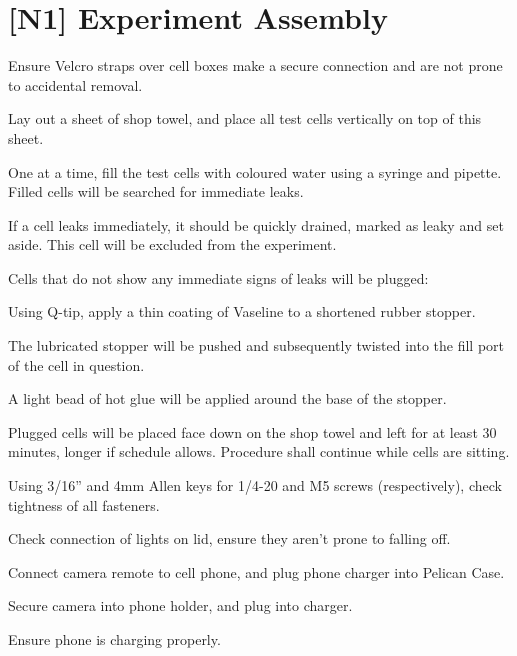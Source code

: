 \section{[N1] Experiment Assembly}
\begin{checklist}
    \item Ensure Velcro straps over cell boxes make a secure connection and are not prone to accidental removal.
    \item Lay out a sheet of shop towel, and place all test cells vertically on top of this sheet.
    \item One at a time, fill the test cells with coloured water using a syringe and pipette. Filled cells will be searched for immediate leaks.
    \begin{checklist}
        \item If a cell leaks immediately, it should be quickly drained, marked as leaky and set aside. This cell will be excluded from the experiment.
        \item Cells that do not show any immediate signs of leaks will be plugged:
        \begin{checklist}
            \item Using Q-tip, apply a thin coating of Vaseline to a shortened rubber stopper.
            \item The lubricated stopper will be pushed and subsequently twisted into the
fill port of the cell in question.
            \item A light bead of hot glue will be applied around the base of the stopper.
        \end{checklist}
        \item Plugged cells will be placed face down on the shop towel and left for at least 30 minutes, longer if schedule allows.  Procedure shall continue while cells are sitting.
    \end{checklist}
    \item Using 3/16'' and 4mm Allen keys for 1/4-20 and M5 screws (respectively), check tightness of all fasteners.
    \item Check connection of lights on lid, ensure they aren’t prone to falling off.
    \item Connect camera remote to cell phone, and plug phone charger into Pelican Case.
    \item Secure camera into phone holder, and plug into charger.
    \begin{checklist}
        \item Ensure phone is charging properly.

\end{checklist}
\end{checklist}
